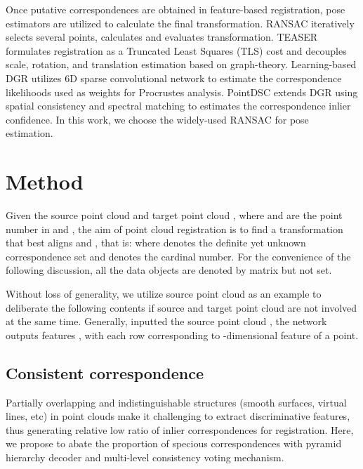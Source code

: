 \documentclass[10pt,twocolumn,letterpaper]{article}
\begin{document}
Once putative correspondences are obtained in feature-based registration, pose estimators\cite{fischler1981random,leordeanu2005spectral,yang2020teaser,yang2019performance,choy2020deep,choy2020high} are utilized to calculate the final transformation. RANSAC\cite{fischler1981random} iteratively selects several points, calculates and evaluates transformation. TEASER\cite{yang2020teaser} formulates registration as a Truncated Least Squares (TLS) cost and decouples scale, rotation, and translation estimation based on graph-theory. Learning-based DGR\cite{choy2020deep} utilizes 6D sparse convolutional network\cite{choy2020high} to estimate the correspondence likelihoods used as weights for Procrustes analysis. PointDSC\cite{bai2021pointdsc} extends DGR using spatial consistency and spectral matching to estimates the correspondence inlier confidence. In this work, we choose the widely-used RANSAC for pose estimation.

\vspace{-.25em}
\section{Method}
\vspace{-.25em}
Given the source point cloud  and target point cloud , where  and  are the point number in  and , the aim of point cloud registration is to find a transformation  that best aligns  and , that is: 
\vspace{-.25em}
where  denotes the definite yet unknown correspondence set and  denotes the cardinal number. For the convenience of the following discussion, all the data objects are denoted by matrix but not set.

Without loss of generality, we utilize source point cloud as an example to deliberate the following contents if source and target point cloud are not involved at the same time. Generally, inputted the source point cloud , the network outputs features , with each row corresponding to -dimensional feature of a point.

\vspace{-.25em}
\subsection{Consistent correspondence}
\vspace{-.25em}

Partially overlapping and indistinguishable structures (smooth surfaces, virtual lines, etc) in point clouds make it challenging to extract discriminative features, thus generating relative low ratio of inlier correspondences for registration. Here, we propose to abate the proportion of specious correspondences with pyramid hierarchy decoder and multi-level consistency voting mechanism.
\end{document}

